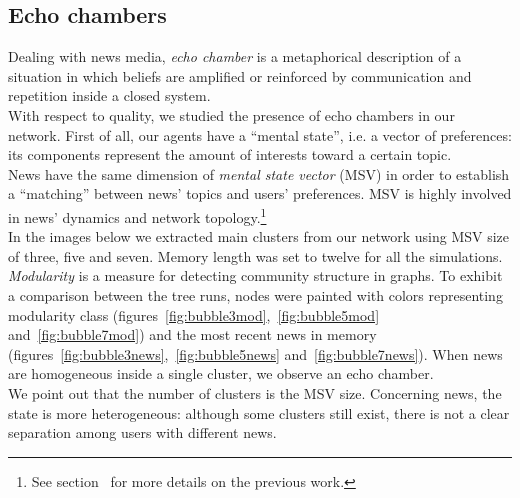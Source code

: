 \subsection{Echo chambers}
Dealing with news media, \textit{echo chamber} is a metaphorical description
of a situation in which beliefs are amplified or reinforced by
communication and repetition inside a closed
system.\cite{echochamwiki,echocham}\\
With respect to quality, we studied the presence of echo chambers
in our network.
First of all, our agents have a ``mental  state'', i.e. a vector of
preferences: its components represent the amount of interests toward
a certain topic.\\
News have the same dimension of \textit{mental state vector} (MSV)
in order to establish a ``matching'' between news' topics and users'
preferences.
MSV is highly involved in news' dynamics and network
topology.\footnote{See section~ for more
  details on the previous work.}\\
In the images below we extracted main clusters from our network using
MSV size of three, five and seven.
Memory length was set to twelve for all the simulations.\\
\textit{Modularity} is a measure for detecting community
structure in graphs.\cite{modulwiki}
To exhibit a comparison between the tree runs,
nodes were painted with colors representing modularity class
(figures~\ref{fig:bubble3mod},~\ref{fig:bubble5mod} and~\ref{fig:bubble7mod})
and the most recent news in memory
(figures~\ref{fig:bubble3news},~\ref{fig:bubble5news} and~\ref{fig:bubble7news}).
When news are homogeneous inside a single cluster, we observe
an echo chamber.\\
We point out that the number of clusters is the MSV size.
Concerning news, the state is more heterogeneous:
although some clusters still exist, there is not a clear separation
among users with different news.
%
